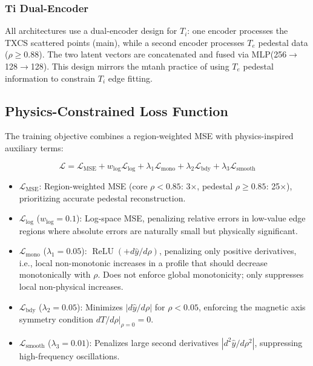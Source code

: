 \documentclass[a4paper,12pt]{article}
\begin{document}
\subsubsection{Ti Dual-Encoder}

All architectures use a dual-encoder design for $T_i$: one encoder processes the TXCS scattered points (main), while a second encoder processes $T_e$ pedestal data ($\rho \geq 0.88$). The two latent vectors are concatenated and fused via MLP(256$\to$128$\to$128). This design mirrors the mtanh practice of using $T_e$ pedestal information to constrain $T_i$ edge fitting.

\subsection{Physics-Constrained Loss Function}

The training objective combines a region-weighted MSE with physics-inspired auxiliary terms:

\begin{equation}
\mathcal{L} = \mathcal{L}_{\text{MSE}} + w_{\log} \mathcal{L}_{\log} + \lambda_1 \mathcal{L}_{\text{mono}} + \lambda_2 \mathcal{L}_{\text{bdy}} + \lambda_3 \mathcal{L}_{\text{smooth}}
\label{eq:loss}
\end{equation}

\begin{itemize}
    \item $\mathcal{L}_{\text{MSE}}$: Region-weighted MSE (core $\rho < 0.85$: 3$\times$, pedestal $\rho \geq 0.85$: 25$\times$), prioritizing accurate pedestal reconstruction.
    \item $\mathcal{L}_{\log}$ ($w_{\log}=0.1$): Log-space MSE, penalizing relative errors in low-value edge regions where absolute errors are naturally small but physically significant.
    \item $\mathcal{L}_{\text{mono}}$ ($\lambda_1=0.05$): $\operatorname{ReLU}(+d\hat{y}/d\rho)$, penalizing only positive derivatives, i.e., local non-monotonic increases in a profile that should decrease monotonically with $\rho$. Does not enforce global monotonicity; only suppresses local non-physical increases.
    \item $\mathcal{L}_{\text{bdy}}$ ($\lambda_2=0.05$): Minimizes $|d\hat{y}/d\rho|$ for $\rho < 0.05$, enforcing the magnetic axis symmetry condition $dT/d\rho|_{\rho=0} = 0$.
    \item $\mathcal{L}_{\text{smooth}}$ ($\lambda_3=0.01$): Penalizes large second derivatives $|d^2\hat{y}/d\rho^2|$, suppressing high-frequency oscillations.
\end{itemize}
\end{document}
